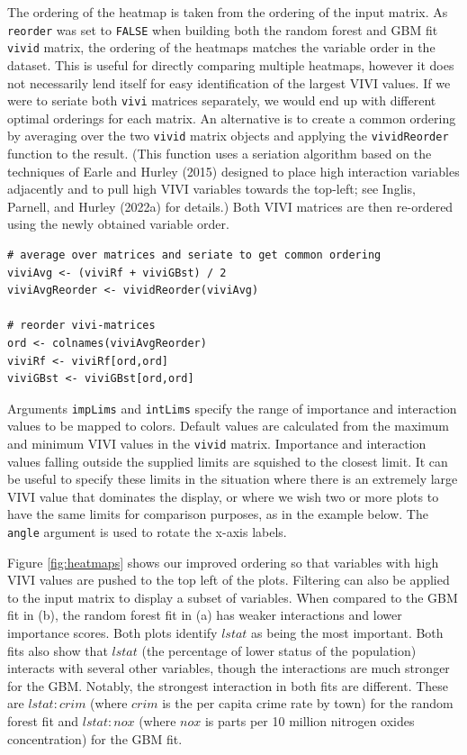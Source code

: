 The ordering of the heatmap is taken from the ordering of the input matrix. As \texttt{reorder} was set to \texttt{FALSE} when building both the random forest and GBM fit \texttt{vivid} matrix, the ordering of the heatmaps matches the variable order in the dataset. This is useful for directly comparing multiple heatmaps, however it does not necessarily lend itself for easy identification of the largest VIVI values. If we were to seriate both \texttt{vivi} matrices separately, we would end up with different optimal orderings for each matrix. An alternative is to create a common ordering by averaging over the two \texttt{vivid} matrix objects and applying the \texttt{vividReorder} function to the result.
(This function uses a seriation algorithm based on the techniques of Earle and Hurley (2015) designed to place high interaction variables adjacently and to pull high VIVI variables towards the top-left; see Inglis, Parnell, and Hurley (2022a) for details.)
Both VIVI matrices are then re-ordered using the newly obtained variable order.

\begin{verbatim}
# average over matrices and seriate to get common ordering
viviAvg <- (viviRf + viviGBst) / 2
viviAvgReorder <- vividReorder(viviAvg)

# reorder vivi-matrices 
ord <- colnames(viviAvgReorder)
viviRf <- viviRf[ord,ord]
viviGBst <- viviGBst[ord,ord]
\end{verbatim}

Arguments \texttt{impLims} and \texttt{intLims} specify the range of importance and interaction values to be mapped to colors. Default values are calculated from the maximum and minimum VIVI values in the \texttt{vivid} matrix. Importance and interaction values falling outside the supplied limits are squished to the closest limit. It can be useful to specify these limits in the situation where there is an extremely large VIVI value that dominates the display, or where we wish two or more plots to have the same limits for comparison purposes, as in the example below. The \texttt{angle} argument is used to rotate the x-axis labels.

Figure \ref{fig:heatmaps} shows our improved ordering so that variables with high VIVI values are pushed to the top left of the plots. Filtering can also be applied to the input matrix to display a subset of variables. When compared to the GBM fit in (b), the random forest fit in (a) has weaker interactions and lower importance scores. Both plots identify \(lstat\) as being the most important. Both fits also show that \(lstat\) (the percentage of lower status of the population) interacts with several other variables, though the interactions are much stronger for the GBM. Notably, the strongest interaction in both fits are different. These are \(lstat:crim\) (where \(crim\) is the per capita crime rate by town) for the random forest fit and \(lstat:nox\) (where \(nox\) is parts per 10 million nitrogen oxides concentration) for the GBM fit.

